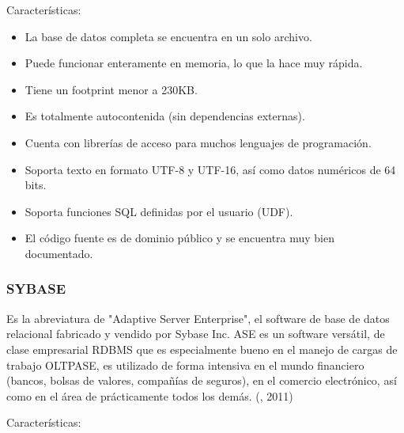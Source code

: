 Características:
\setlength{\parskip}{0mm}
\begin{itemize}

\item La base de datos completa se encuentra en un solo archivo.

\item Puede funcionar enteramente en memoria, lo que la hace muy rápida.

\item Tiene un footprint menor a 230KB.

\item Es totalmente autocontenida (sin dependencias externas).

\item Cuenta con librerías de acceso para muchos lenguajes de programación.

\item Soporta texto en formato UTF-8 y UTF-16, así como datos numéricos de 64 bits.

\item Soporta funciones SQL definidas por el usuario (UDF).

\item El código fuente es de dominio público y se encuentra muy bien documentado.

\end{itemize}


\subsubsection{SYBASE}
\setlength{\parskip}{5mm}
Es la abreviatura de "Adaptive Server Enterprise", el software de base de datos relacional fabricado y vendido por Sybase Inc. ASE es un software versátil, de clase empresarial RDBMS que es especialmente bueno en el manejo de cargas de trabajo OLTPASE, es utilizado de forma intensiva en el mundo financiero (bancos, bolsas de valores, compañías de seguros), en el comercio electrónico, así como en el área de prácticamente todos los demás. (\citet{sybasebib}, 2011)

Características:
\setlength{\parskip}{0mm}


